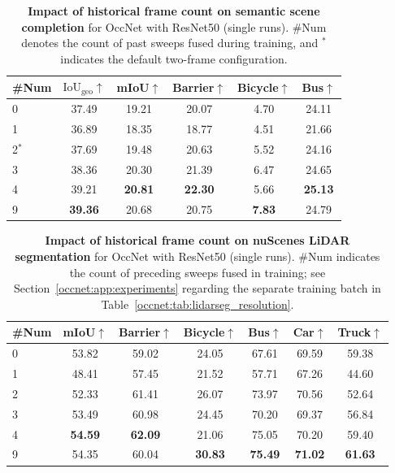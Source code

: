 \begin{table}[t]
  \centering
  \caption[Temporal window sweep on semantic scene completion]{\textbf{Impact of historical frame count on semantic scene completion} for OccNet with ResNet50 (single runs). \#Num denotes the count of past sweeps fused during training, and $^{\ast}$ indicates the default two-frame configuration.}
  \label{occnet:tab:frame_number_ssc}
  \begin{tabular}{lccccc}
    \toprule
    \#Num & $\text{IoU}_{\text{geo}}$$\uparrow$ & mIoU$\uparrow$ & Barrier$\uparrow$ & Bicycle$\uparrow$ & Bus$\uparrow$ \\
    \midrule
    0          & 37.49 & 19.21 & 20.07 & 4.70 & 24.11 \\
    1          & 36.89 & 18.35 & 18.77 & 4.51 & 21.66 \\
    2$^{\ast}$ & 37.69 & 19.48 & 20.63 & 5.52 & 24.16 \\
    3          & 38.36 & 20.30 & 21.39 & 6.47 & 24.65 \\
    4          & 39.21 & \textbf{20.81} & \textbf{22.30} & 5.66 & \textbf{25.13} \\
    9          & \textbf{39.36} & 20.68 & 20.75 & \textbf{7.83} & 24.79 \\
    \bottomrule
  \end{tabular}
\end{table}

\begin{table}[t]
  \centering
  \caption[Temporal window sweep on LiDAR segmentation]{\textbf{Impact of historical frame count on nuScenes LiDAR segmentation} for OccNet with ResNet50 (single runs). \#Num indicates the count of preceding sweeps fused in training; see Section~\ref{occnet:app:experiments} regarding the separate training batch in Table~\ref{occnet:tab:lidarseg_resolution}.}
  \label{occnet:tab:frame_number_lidarseg}
  \begin{tabular}{lcccccc}
    \toprule
    \#Num & mIoU$\uparrow$ & Barrier$\uparrow$ & Bicycle$\uparrow$ & Bus$\uparrow$ & Car$\uparrow$ & Truck$\uparrow$ \\
    \midrule
    0 & 53.82 & 59.02 & 24.05 & 67.61 & 69.59 & 59.38 \\
    1 & 48.41 & 57.45 & 21.52 & 57.71 & 67.26 & 44.60 \\
    2 & 52.33 & 61.41 & 26.07 & 73.97 & 70.56 & 52.64 \\
    3 & 53.49 & 60.98 & 24.45 & 70.20 & 69.37 & 56.84 \\
    4 & \textbf{54.59} & \textbf{62.09} & 21.06 & 75.05 & 70.20 & 59.40 \\
    9 & 54.35 & 60.04 & \textbf{30.83} & \textbf{75.49} & \textbf{71.02} & \textbf{61.63} \\
    \bottomrule
  \end{tabular}
\end{table}

